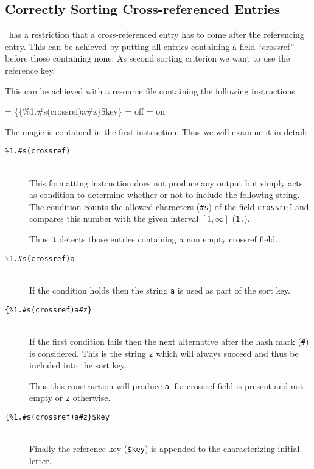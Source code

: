 \documentclass[11pt,a4paper]{scrbook}
\begin{document}
\subsection{Correctly Sorting Cross-referenced Entries}

\BibTeX\ has a restriction that a cross-referenced entry has to come after the
referencing entry. This can be achieved by putting all entries containing a
field ``crossref'' before those containing none. As second sorting criterion
we want to use the reference key.

This can be achieved with a resource file containing the
following instructions

\begin{Resources}
   = \{\{\%1.\#s(crossref)a\#z\}\$key\}
   = off
   = on
\end{Resources}

The magic is contained in the first instruction. Thus we will examine it in
detail: 
\begin{description}
\item [\texttt{\%1.\#s(crossref)}]\ \\
  This formatting instruction does not produce any output but simply acts as
  condition to determine whether or not to include the following string. The
  condition counts the allowed characters (\texttt{\#s}) of the field
  \texttt{crossref} and compares this number with the given interval
  \([1,\infty]\) (\texttt{1.}).

  Thus it detects those entries containing a non empty crossref field.
\item [\texttt{\%1.\#s(crossref)a}]\ \\
  If the condition holds then the string \texttt{a} is used as part of the
  sort key.
\item [\texttt{\{\%1.\#s(crossref)a\#z\}}]\ \\
  If the first condition fails then the next alternative after the hash mark
  (\texttt{\#}) is considered. This is the string \texttt{z} which will always
  succeed and thus be included into the sort key.

  Thus this construction will produce \texttt{a} if a crossref field is
  present and not empty or \texttt{z} otherwise.
\item [\texttt{\{\%1.\#s(crossref)a\#z\}\$key}]\ \\
  Finally the reference key (\texttt{\$key}) is appended to the characterizing
  initial letter.
\end{description}
\end{document}
